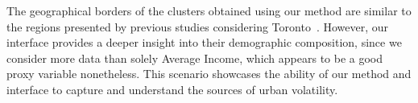 The geographical borders of the clusters obtained using our method are similar
to the regions presented by previous studies considering
Toronto~\citep{hulchanski2007three}. However, our interface provides a deeper insight
into their demographic composition, since we consider more data than solely
Average Income, which appears to be a good proxy variable nonetheless. This
scenario showcases the ability of our method and interface to capture and
understand the sources of urban volatility.








